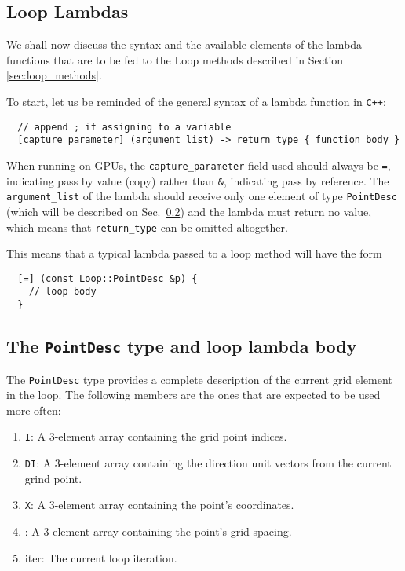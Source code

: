 \subsection{Loop Lambdas}

We shall now discuss the syntax and the available elements of the lambda functions that are to be fed to the Loop methods described in Section \ref{sec:loop_methods}.

To start, let us be reminded of the general syntax of a lambda function in \texttt{C++}:

\begin{lstlisting}
  // append ; if assigning to a variable
  [capture_parameter] (argument_list) -> return_type { function_body }
\end{lstlisting}

When running on GPUs, the \texttt{capture\_parameter} field used should always be \texttt{=}, indicating pass by value (copy) rather than \texttt{\&}, indicating pass by reference. The \texttt{argument\_list} of the lambda should receive only one element of type \texttt{PointDesc} (which will be described on Sec.~\ref{sec:point_des}) and the lambda must return no value, which means that \texttt{return\_type} can be omitted altogether.

This means that a typical lambda passed to a loop method will have the form
%
\begin{lstlisting}
  [=] (const Loop::PointDesc &p) {
    // loop body
  }
\end{lstlisting}

\subsection{The \texttt{PointDesc} type and loop lambda body}
\label{sec:point_des}

The \texttt{PointDesc} type provides a complete description of the current grid element in the loop. The following members are the ones that are expected to be used more often:
%
\begin{enumerate}
  \item \texttt{I}: A 3-element array containing the grid point indices.
  \item \texttt{DI}: A 3-element array containing the direction unit vectors from the current grind point.
  \item \texttt{X}: A 3-element array containing the point's coordinates.
  \item {}: A 3-element array containing the point's grid spacing.
  \item {iter}: The current loop iteration.
\end{enumerate}

